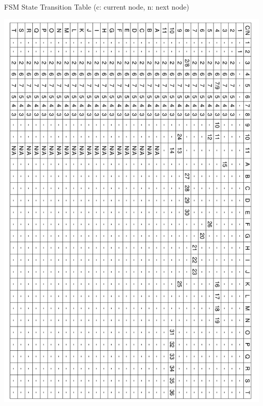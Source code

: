 \begin{justify}
    \clearpage
    \begin{table}[H]
        \caption{FSM State Transition Table (c: current node, n: next node)}
        \begin{minipage}[trim]{1\textwidth}
        \includegraphics[width=\textwidth]{figures/implementation_and_testing/testing/FSM/fsm V1 (1).pdf}
        \end{minipage}
    \end{table}


\end{justify}

